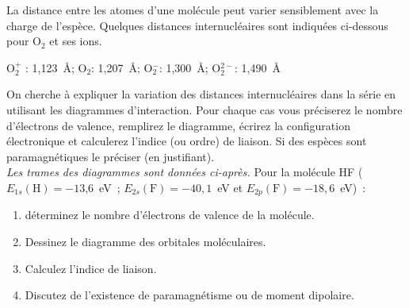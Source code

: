 \clearpage
La distance entre les atomes d'une mol\'ecule peut varier sensiblement avec la charge de l'esp\`ece.
Quelques distances internucl\'eaires sont indiqu\'ees ci-dessous pour O$_2$ et ses ions.
\begin{tabbing}
\hspace{1cm}O$_2^+$ : 1,123~\AA ; O$_2$: 1,207~\AA ; O$_2^-$: 1,300~\AA ; O$_2^{2-}$: 1,490~\AA
\end{tabbing}
On cherche \`a  expliquer la variation des distances internucl\'eaires dans la s\'erie 
en utilisant les diagrammes d'interaction. %
Pour chaque cas vous pr\'eciserez le nombre d'\'electrons de valence, remplirez le diagramme, 
\'ecrirez  la configuration \'electronique et calculerez l'indice (ou ordre) de
liaison. Si des esp\`eces sont paramagn\'etiques le pr\'eciser (en justifiant).\\

\textit{Les trames des diagrammes sont donn\'ees ci-apr\`es.}
Pour la mol\'ecule HF 
($E_{1s}(\textrm{H})=-13\textrm{,}6$~eV~; $E_{2s}(\textrm{F})=-40,1$~eV et $E_{2p}(\textrm{F})=-18,6$~eV)~:
\begin{enumerate}[\bf 1)]
\item d\'eterminez le nombre d'\'electrons de valence de la mol\'ecule.
\item Dessinez le diagramme des orbitales mol\'eculaires.
\item Calculez l'indice de liaison.
\item Discutez de l'existence de paramagn\'etisme ou de moment dipolaire.
\end{enumerate}


